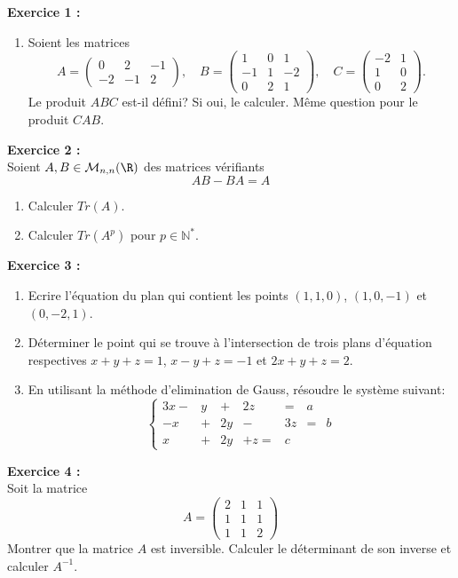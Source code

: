 \documentclass[11pt]{article}
\begin{document}
 \noindent \textbf{Exercice 1 :}\\
 \begin{enumerate}
 \item Soient les matrices $$A = \begin{pmatrix} 0 & 2 & -1  \\ -2 & -1 & 2 \end{pmatrix}, \quad B = \begin{pmatrix} 1 & 0 & 1  \\ -1 &  1 & -2 \\ 
0 & 2 & 1 \end{pmatrix}, \quad C = \begin{pmatrix} -2 & 1  \\ 1 & 0\\ 
 0 & 2\end{pmatrix} .$$ Le produit $ABC$ est-il défini? Si oui, le calculer. Même question pour le produit $CAB$.


\end{enumerate}
\noindent \textbf{Exercice 2 :}\\
Soient $A,B \in \mathcal{M}_{n,n}(\R)$ des matrices vérifiants 
\begin{equation}
AB - BA = A
\end{equation}

\begin{enumerate}
\item Calculer $Tr(A)$.
\item Calculer $Tr(A^p)$ pour $p\in \mathbb{N^{*}}$.\\
\end{enumerate}
\textbf{Exercice 3 :}\\ 
\begin{enumerate}
\item Ecrire l'équation du plan qui contient les points $(1,1,0)$, $(1,0,-1)$ et $(0,-2,1)$.\\
\item Déterminer le point qui se trouve à l'intersection  de trois plans d'équation respectives $x+y+z=1$, $x-y+z=-1$ et $2x+y+z=2$.
\item En utilisant la méthode d'elimination de Gauss, résoudre le système suivant:
$$\left\{\begin{array}{cccccccc}3x-&y&+&2z&=&a\\-x&+&2y&-&3z&=&b\\x&+&2y& + z=&c\end{array}\right.$$
\end{enumerate}
\noindent \textbf{Exercice 4 :}\\
Soit la matrice 
\begin{equation*}
A=
\begin{pmatrix}
2 &1& 1\\
1 &1 &1\\
1 &1& 2
\end{pmatrix}
\end{equation*}
 Montrer que la matrice $A$ est inversible. Calculer le déterminant de son inverse et calculer $A^{-1}$. 
\end{document}
